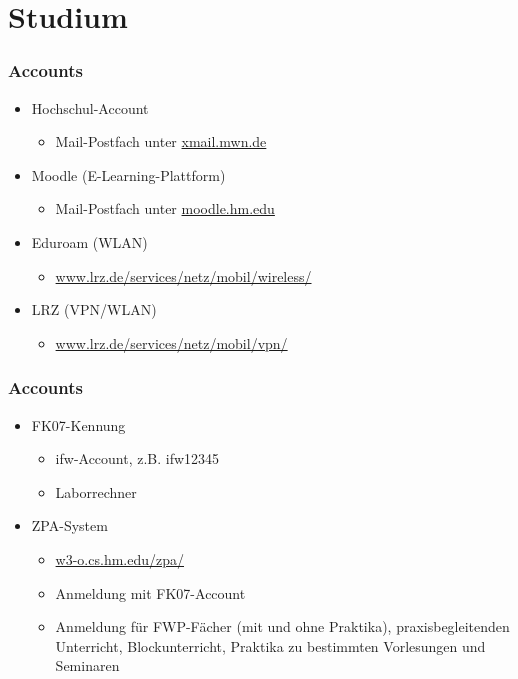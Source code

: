\documentclass{beamer}
\begin{document}
	\section{Studium}
	
	\begin{frame}[t]
		\frametitle{Accounts}
		\begin{itemize}
			\item Hochschul-Account
			\begin{itemize}
				\item Mail-Postfach unter \url{xmail.mwn.de}
			\end{itemize}
			\pause
			\item Moodle (E-Learning-Plattform)
			\begin{itemize}
				\item Mail-Postfach unter \url{moodle.hm.edu}
			\end{itemize}
			\pause
			\item Eduroam (WLAN)
			\begin{itemize}
				\item \url{www.lrz.de/services/netz/mobil/wireless/}
			\end{itemize}
			\pause
			\item LRZ (VPN/WLAN)
			\begin{itemize}
				\item \url{www.lrz.de/services/netz/mobil/vpn/}
			\end{itemize}
		\end{itemize}
	\end{frame}
	
	\begin{frame}[t]
		\frametitle{Accounts}
		\begin{itemize}
			\item FK07-Kennung
			\begin{itemize}
				\item ifw-Account, z.B. ifw12345
				\item Laborrechner
			\end{itemize}
			\pause
			\item ZPA-System
			\begin{itemize}
				\item \url{w3-o.cs.hm.edu/zpa/}
				\item Anmeldung mit FK07-Account
				\item Anmeldung für FWP-Fächer (mit und ohne Praktika),
				praxisbegleitenden Unterricht,
				Blockunterricht,
				Praktika zu bestimmten Vorlesungen und
				Seminaren
			\end{itemize}
		\end{itemize}
	\end{frame}
	
\end{document}
